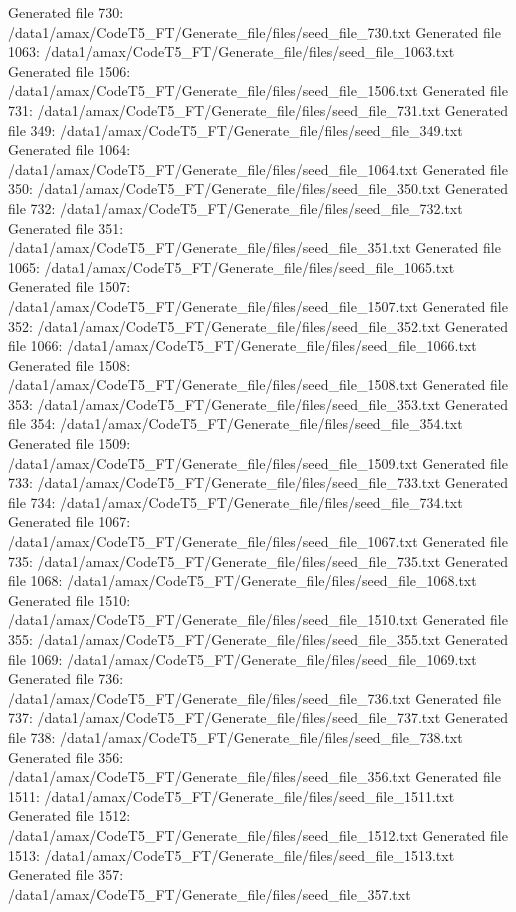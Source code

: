 Generated file 730: /data1/amax/CodeT5_FT/Generate_file/files/seed_file_730.txt
Generated file 1063: /data1/amax/CodeT5_FT/Generate_file/files/seed_file_1063.txt
Generated file 1506: /data1/amax/CodeT5_FT/Generate_file/files/seed_file_1506.txt
Generated file 731: /data1/amax/CodeT5_FT/Generate_file/files/seed_file_731.txt
Generated file 349: /data1/amax/CodeT5_FT/Generate_file/files/seed_file_349.txt
Generated file 1064: /data1/amax/CodeT5_FT/Generate_file/files/seed_file_1064.txt
Generated file 350: /data1/amax/CodeT5_FT/Generate_file/files/seed_file_350.txt
Generated file 732: /data1/amax/CodeT5_FT/Generate_file/files/seed_file_732.txt
Generated file 351: /data1/amax/CodeT5_FT/Generate_file/files/seed_file_351.txt
Generated file 1065: /data1/amax/CodeT5_FT/Generate_file/files/seed_file_1065.txt
Generated file 1507: /data1/amax/CodeT5_FT/Generate_file/files/seed_file_1507.txt
Generated file 352: /data1/amax/CodeT5_FT/Generate_file/files/seed_file_352.txt
Generated file 1066: /data1/amax/CodeT5_FT/Generate_file/files/seed_file_1066.txt
Generated file 1508: /data1/amax/CodeT5_FT/Generate_file/files/seed_file_1508.txt
Generated file 353: /data1/amax/CodeT5_FT/Generate_file/files/seed_file_353.txt
Generated file 354: /data1/amax/CodeT5_FT/Generate_file/files/seed_file_354.txt
Generated file 1509: /data1/amax/CodeT5_FT/Generate_file/files/seed_file_1509.txt
Generated file 733: /data1/amax/CodeT5_FT/Generate_file/files/seed_file_733.txt
Generated file 734: /data1/amax/CodeT5_FT/Generate_file/files/seed_file_734.txt
Generated file 1067: /data1/amax/CodeT5_FT/Generate_file/files/seed_file_1067.txt
Generated file 735: /data1/amax/CodeT5_FT/Generate_file/files/seed_file_735.txt
Generated file 1068: /data1/amax/CodeT5_FT/Generate_file/files/seed_file_1068.txt
Generated file 1510: /data1/amax/CodeT5_FT/Generate_file/files/seed_file_1510.txt
Generated file 355: /data1/amax/CodeT5_FT/Generate_file/files/seed_file_355.txt
Generated file 1069: /data1/amax/CodeT5_FT/Generate_file/files/seed_file_1069.txt
Generated file 736: /data1/amax/CodeT5_FT/Generate_file/files/seed_file_736.txt
Generated file 737: /data1/amax/CodeT5_FT/Generate_file/files/seed_file_737.txt
Generated file 738: /data1/amax/CodeT5_FT/Generate_file/files/seed_file_738.txt
Generated file 356: /data1/amax/CodeT5_FT/Generate_file/files/seed_file_356.txt
Generated file 1511: /data1/amax/CodeT5_FT/Generate_file/files/seed_file_1511.txt
Generated file 1512: /data1/amax/CodeT5_FT/Generate_file/files/seed_file_1512.txt
Generated file 1513: /data1/amax/CodeT5_FT/Generate_file/files/seed_file_1513.txt
Generated file 357: /data1/amax/CodeT5_FT/Generate_file/files/seed_file_357.txt
